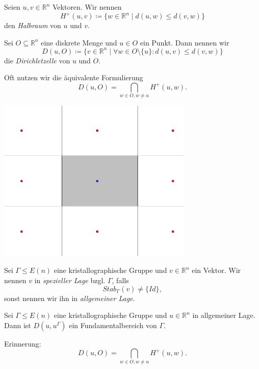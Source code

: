 \documentclass{beamer}
\theoremstyle{plain}
\newcommand\R{\mathbb R}
\begin{document}
\begin{frame}
    \begin{definition}
        Seien $u, v \in \R^n$ Vektoren. Wir nennen
        $$
            H^+(u, v) \coloneqq \{ w \in \R^n \mid d(u,w) \leq d(v, w) \}
        $$
        den \emph{Halbraum} von $u$ und $v$.
    \end{definition}
    \pause
    \begin{definition}
        Sei $O \subseteq \R^n$ eine diskrete Menge und $u \in O$ ein Punkt.
        Dann nennen wir 
        $$
		    D(u, O) \coloneqq \{ v \in \R^n \mid \forall w \in O \setminus \{ u \} : d(u, v) \leq d(v, w) \}
	    $$
        die \emph{Dirichletzelle} von $u$ und $O$.
    \end{definition} \pause
    Oft nutzen wir die äquivalente Formulierung
    $$
		D(u, O) = \bigcap_{w \in O, w \neq u} H^+(u, w).
	$$
\end{frame}

\begin{frame}
    \centering
    \includegraphics[width=0.7\textwidth]{images/dirichlet-example.png}
\end{frame}

\begin{frame}
    \begin{definition}
        Sei $\Gamma \leq E(n)$ eine kristallographische Gruppe und $v \in \R^n$ ein Vektor.
        Wir nennen $v$ in \emph{spezieller Lage} bzgl. $\Gamma$, falls 
        $$
            Stab_\Gamma(v) \neq \{Id\},
        $$
        sonst nennen wir ihn in \emph{allgemeiner Lage}.
    \end{definition}
    \pause
    \begin{theorem}
        Sei $\Gamma \leq E(n)$ eine kristallographische Gruppe und $u \in \R^n$ in allgemeiner Lage. Dann ist $D(u, u^\Gamma)$ ein Fundamentalbereich von $\Gamma$.
    \end{theorem}
    \pause
    Erinnerung:
    $$
		D(u, O) = \bigcap_{w \in O, w \neq u} H^+(u, w).
	$$
\end{frame}
\end{document}
